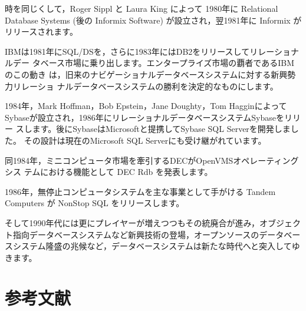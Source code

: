 時を同じくして，Roger Sippl と Laura King によって 1980年に Relational
Database Systems (後の Informix Software) が設立され，翌1981年に
Informix がリリースされます。


IBMは1981年にSQL/DSを，さらに1983年にはDB2をリリースしてリレーショナルデー
タベース市場に乗り出します。エンタープライズ市場の覇者であるIBMのこの動き
は，旧来のナビゲーショナルデータベースシステムに対する新興勢力リレーショ
ナルデータベースシステムの勝利を決定的なものにします。


1984年，Mark Hoffman，Bob Epstein，Jane Doughty，Tom Hagginによって
Sybaseが設立され，1986年にリレーショナルデータベースシステムSybaseをリリー
スします。後にSybaseはMicrosoftと提携してSybase SQL Serverを開発しました。
その設計は現在のMicrosoft SQL Serverにも受け継がれています。


同1984年，ミニコンピュータ市場を牽引するDECがOpenVMSオペレーティングシス
テムにおける機能として DEC Rdb を発表します。


1986年，無停止コンピュータシステムを主な事業として手がける Tandem
Computers が NonStop SQL をリリースします。


そして1990年代には更にプレイヤーが増えつつもその統廃合が進み，オブジェク
ト指向データベースシステムなど新興技術の登場，オープンソースのデータベー
スシステム隆盛の兆候など，データベースシステムは新たな時代へと突入してゆ
きます。


\section*{参考文献}


\small


